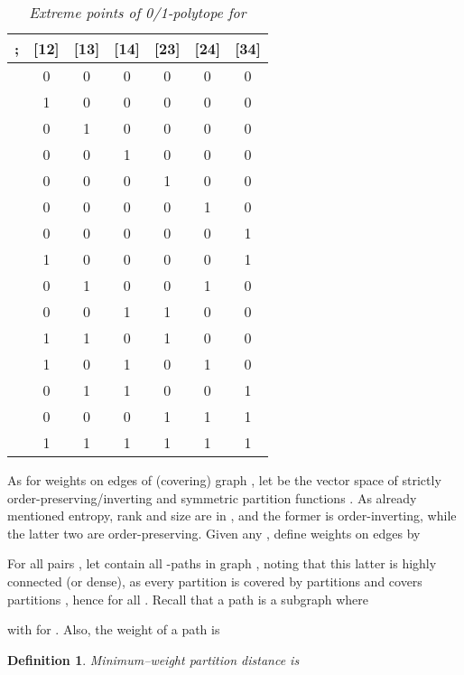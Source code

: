 \documentclass[a4paper,10pt]{article}
\newtheorem{definition}[theorem]{Definition}
\begin{document}
\begin{table}[htbp]
\caption{\textsl{Extreme points of 0/1-polytope  for }}
\label{tab: extreme points}
\smallskip
\begin{center}
\begin{tabular}{|c|c|c|c|c|c|c|}
\hline
  ;   & [12] & [13] & [14] & [23] & [24] & [34]\\
\hline
 &0 & 0 & 0 & 0 & 0 & 0 \\
\hline
 & 1 & 0 & 0 & 0 & 0 & 0\\
\hline
 & 0 & 1 & 0 & 0 & 0 & 0\\
\hline
 & 0 & 0 & 1 & 0 & 0 & 0\\
\hline
 & 0 & 0 & 0 & 1 & 0 & 0\\
\hline
 & 0 & 0 & 0 & 0 & 1 & 0\\
\hline
 & 0 & 0 & 0 & 0 & 0 & 1\\
\hline
 & 1 & 0 & 0 & 0 & 0 & 1\\
\hline
 & 0 & 1 & 0 & 0 & 1 & 0\\
\hline
 & 0 & 0 & 1 & 1 & 0 & 0\\
\hline
 & 1 & 1 & 0 & 1 & 0 & 0\\
\hline
 & 1 & 0 & 1 & 0 & 1 & 0\\
\hline
 & 0 & 1 & 1 & 0 & 0 & 1\\
\hline
 & 0 & 0 & 0 & 1 & 1 & 1\\
\hline
 & 1 & 1 & 1 & 1 & 1 & 1\\
\hline
\end{tabular}
\end{center}
\end{table}

As for weights on edges  of (covering) graph , let  be the vector space of strictly
order-preserving/inverting and symmetric partition functions . As already mentioned entropy, rank and size are in , and the former
is order-inverting, while the latter two are order-preserving. Given any , define weights
 on edges  by

For all pairs , let  contain all -paths in graph , noting that this latter is highly connected (or dense), as every partition
 is covered by  partitions  and covers  partitions , hence  for all . Recall that a path
 is a subgraph  where

with  for . Also, the weight of a path  is


\begin{definition}
Minimum--weight partition distance  is

\end{definition}
\end{document}
